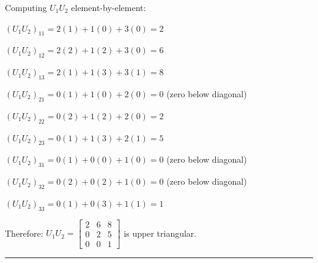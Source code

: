 Computing $U_1U_2$ element-by-element:

$(U_1U_2)_{11} = 2(1) + 1(0) + 3(0) = 2$

$(U_1U_2)_{12} = 2(2) + 1(2) + 3(0) = 6$

$(U_1U_2)_{13} = 2(1) + 1(3) + 3(1) = 8$

$(U_1U_2)_{21} = 0(1) + 1(0) + 2(0) = 0$ (zero below diagonal)

$(U_1U_2)_{22} = 0(2) + 1(2) + 2(0) = 2$

$(U_1U_2)_{23} = 0(1) + 1(3) + 2(1) = 5$

$(U_1U_2)_{31} = 0(1) + 0(0) + 1(0) = 0$ (zero below diagonal)

$(U_1U_2)_{32} = 0(2) + 0(2) + 1(0) = 0$ (zero below diagonal)

$(U_1U_2)_{33} = 0(1) + 0(3) + 1(1) = 1$

Therefore: $U_1U_2 = \begin{bmatrix} 2 & 6 & 8 \\ 0 & 2 & 5 \\ 0 & 0 & 1 \end{bmatrix}$ is upper triangular.

\vspace{2em}
\noindent\rule{\textwidth}{0.4pt}
